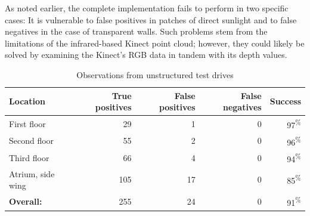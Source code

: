 \documentclass[12pt]{report}
\begin{document}
As noted earlier, the complete implementation fails to perform in two specific cases:  It is vulnerable to false positives in patches of direct sunlight and to false negatives in the case of transparent walls.  Such problems stem from the limitations of the infrared-based Kinect point cloud; however, they could likely be solved by examining the Kinect's RGB data in tandem with its depth values.

\begin{table}[h]
\caption[Test drives]{Observations from unstructured test drives}
\label{tab:drives}
\begin{center}
\begin{tabular}{| p{} | r | r | r | r |}
\hline
\scriptsize\textbf{Location} & \scriptsize\textbf{True positives} & \scriptsize\textbf{False positives} & \scriptsize\textbf{False negatives} & \scriptsize\textbf{Success} \\
\hline\hline
\scriptsize First floor & 29 & 1 & 0 & 97\textsuperscript{\%} \\
\hline
\scriptsize Second floor & 55 & 2 & 0 & 96\textsuperscript{\%} \\
\hline
\scriptsize Third floor & 66 & 4 & 0 & 94\textsuperscript{\%} \\
\hline
\scriptsize Atrium, side wing & 105 & 17 & 0 & 85\textsuperscript{\%} \\
\hline\hline
\scriptsize\textbf{Overall:} & 255 & 24 & 0 & 91\textsuperscript{\%} \\
\hline
\end{tabular}
\end{center}
\end{table}
\end{document}
